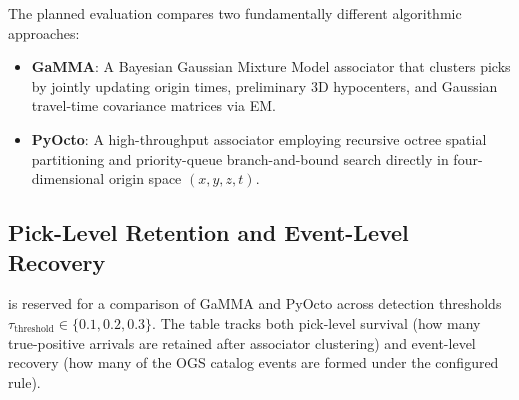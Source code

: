 The planned evaluation compares two fundamentally different algorithmic
approaches:
\begin{itemize}
  \item \textbf{\ac{GaMMA}}: A Bayesian Gaussian Mixture
    Model associator that clusters picks by jointly updating origin
    times, preliminary 3D hypocenters, and Gaussian travel-time
    covariance matrices via \ac{EM}.
  \item \textbf{\ac{PyOcto}}: A high-throughput
    associator employing recursive octree spatial partitioning and
    priority-queue branch-and-bound search directly in
    four-dimensional origin space $(x, y, z, t)$.
\end{itemize}

\subsection{Pick-Level Retention and Event-Level Recovery}
\label{subsec:associator_pick_event_performance}

 is reserved for a comparison
of \ac{GaMMA} and \ac{PyOcto} across detection thresholds
$\tau_{\mathrm{threshold}} \in \{0.1, 0.2, 0.3\}$. The table tracks
both pick-level survival (how many true-positive arrivals are
retained after associator clustering) and event-level recovery (how
  many of the  \ac{OGS} catalog events are
formed under the configured rule).

